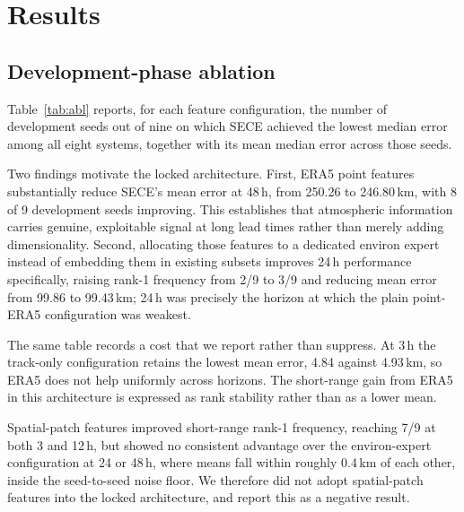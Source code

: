 \documentclass[10pt,twocolumn,a4paper]{article}
\newcommand{\sece}{SECE}
\newcommand{\era}{ERA5}
\begin{document}
\section{Results}
\label{sec:results}

\subsection{Development-phase ablation}
\label{sec:ablation}
Table~\ref{tab:abl} reports, for each feature configuration, the number of
development seeds out of nine on which \sece{} achieved the lowest median error
among all eight systems, together with its mean median error across those seeds.

Two findings motivate the locked architecture. First, \era{} point features
substantially reduce \sece{}'s mean error at 48\,h, from 250.26 to 246.80\,km,
with 8 of 9 development seeds improving. This establishes that atmospheric
information carries genuine, exploitable signal at long lead times rather than
merely adding dimensionality. Second, allocating those features to a dedicated
environ expert instead of embedding them in existing subsets improves 24\,h
performance specifically, raising rank-1 frequency from 2/9 to 3/9 and reducing
mean error from 99.86 to 99.43\,km; 24\,h was precisely the horizon at which the
plain point-\era{} configuration was weakest.

The same table records a cost that we report rather than suppress. At 3\,h the
track-only configuration retains the lowest mean error, 4.84 against 4.93\,km, so
\era{} does not help uniformly across horizons. The short-range gain from \era{}
in this architecture is expressed as rank stability rather than as a lower mean.

Spatial-patch features improved short-range rank-1 frequency, reaching 7/9 at both
3 and 12\,h, but showed no consistent advantage over the environ-expert
configuration at 24 or 48\,h, where means fall within roughly 0.4\,km of each
other, inside the seed-to-seed noise floor. We therefore did not adopt
spatial-patch features into the locked architecture, and report this as a negative
result.
\end{document}
